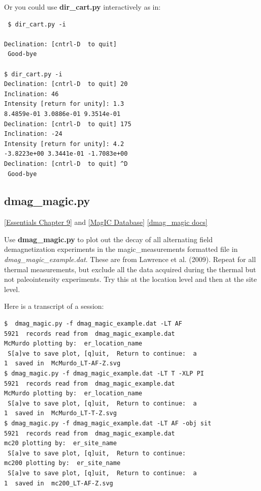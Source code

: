 \documentclass[11pt]{book}
\begin{document}
{{ Or you could use {\bf dir\_cart.py} interactively as in:

 \begin{verbatim}
 $ dir_cart.py -i

Declination: [cntrl-D  to quit]
 Good-bye

$ dir_cart.py -i
Declination: [cntrl-D  to quit] 20
Inclination: 46
Intensity [return for unity]: 1.3
8.4859e-01 3.0886e-01 9.3514e-01
Declination: [cntrl-D  to quit] 175
Inclination: -24
Intensity [return for unity]: 4.2
-3.8223e+00 3.3441e-01 -1.7083e+00
Declination: [cntrl-D  to quit] ^D
 Good-bye
\end{verbatim}

%
%
 \subsection{dmag\_magic.py}
  \href{http://earthref.org/MAGIC/books/Tauxe/Essentials/WebBook3ch9.html#ch9}{[Essentials Chapter 9]} and \href{#MagICDatabase}{[MagIC Database]}
  \href{https://github.com/PmagPy/PmagPy/blob/master/programs/dmag_magic.py}{[dmag\_magic docs]}

Use {\bf dmag\_magic.py} to plot out the decay of all alternating field demagnetization experiments in the magic\_measurements
formatted file in {\it dmag\_magic\_example.dat}.   These are from Lawrence et al. (2009). \nocite{lawrence09}  Repeat for all thermal measurements, but exclude all the data acquired during the thermal but not  paleointensity experiments.   Try this at the location level and then at the site level.

Here is a transcript of a session:

\begin{verbatim}
$  dmag_magic.py -f dmag_magic_example.dat -LT AF
5921  records read from  dmag_magic_example.dat
McMurdo plotting by:  er_location_name
 S[a]ve to save plot, [q]uit,  Return to continue:  a
1  saved in  McMurdo_LT-AF-Z.svg
$ dmag_magic.py -f dmag_magic_example.dat -LT T -XLP PI
5921  records read from  dmag_magic_example.dat
McMurdo plotting by:  er_location_name
 S[a]ve to save plot, [q]uit,  Return to continue:  a
1  saved in  McMurdo_LT-T-Z.svg
$ dmag_magic.py -f dmag_magic_example.dat -LT AF -obj sit
5921  records read from  dmag_magic_example.dat
mc20 plotting by:  er_site_name
 S[a]ve to save plot, [q]uit,  Return to continue:
mc200 plotting by:  er_site_name
 S[a]ve to save plot, [q]uit,  Return to continue:  a
1  saved in  mc200_LT-AF-Z.svg


\end{verbatim}}}
\end{document}
